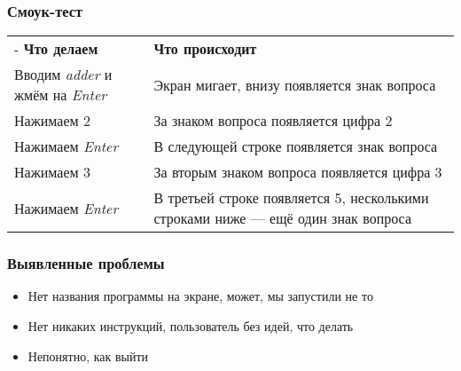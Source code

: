 \documentclass[xetex,mathserif,serif]{beamer}
\begin{document}
	\begin{frame}
		\frametitle{Смоук-тест}
		\begin{center}
			\begin{tabu} {| X[0.6 l p] | X[1 l p] |}
				\tabucline-
				\everyrow{\tabucline-}
				\textbf{Что делаем}                             & \textbf{Что происходит}                                                            \\
				Вводим \textit{adder} и жмём на \textit{Enter}  & Экран мигает, внизу появляется знак вопроса                                        \\
				Нажимаем 2                                      & За знаком вопроса появляется цифра 2                                               \\
				Нажимаем \textit{Enter}                         & В следующей строке появляется знак вопроса                                         \\
				Нажимаем 3                                      & За вторым знаком вопроса появляется цифра 3                                        \\
				Нажимаем \textit{Enter}                         & В третьей строке появляется 5, несколькими строками ниже --- ещё один знак вопроса
			\end{tabu}
		\end{center}
	\end{frame}

	\begin{frame}
		\frametitle{Выявленные проблемы}
		\begin{itemize}
			\item Нет названия программы на экране, может, мы запустили не то
			\item Нет никаких инструкций, пользователь без идей, что делать
			\item Непонятно, как выйти
		\end{itemize}
	\end{frame}
\end{document}
